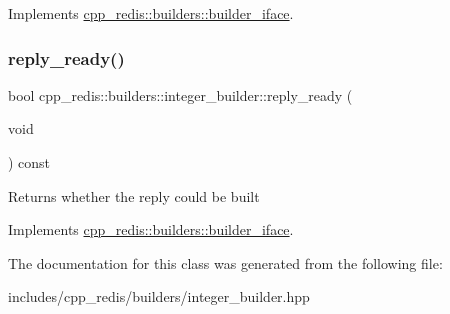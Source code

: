 Implements \mbox{\hyperlink{classcpp__redis_1_1builders_1_1builder__iface_a9892bbc9c887c31c2742dad4476e2fa6}{cpp\+\_\+redis\+::builders\+::builder\+\_\+iface}}.

\mbox{\label{classcpp__redis_1_1builders_1_1integer__builder_a4893dc36d06d75094bb4fe3fbc826966}} 
\subsubsection{\texorpdfstring{reply\+\_\+ready()}{reply\_ready()}}
{\footnotesize\ttfamily bool cpp\+\_\+redis\+::builders\+::integer\+\_\+builder\+::reply\+\_\+ready (\begin{DoxyParamCaption}\item[{void}]{ }\end{DoxyParamCaption}) const\hspace{0.3cm}{\ttfamily [virtual]}}

\begin{DoxyReturn}{Returns}
whether the reply could be built 
\end{DoxyReturn}


Implements \mbox{\hyperlink{classcpp__redis_1_1builders_1_1builder__iface_a40db9a31d4ea1771777e74146d31e12d}{cpp\+\_\+redis\+::builders\+::builder\+\_\+iface}}.



The documentation for this class was generated from the following file\+:\begin{DoxyCompactItemize}
\item 
includes/cpp\+\_\+redis/builders/integer\+\_\+builder.\+hpp\end{DoxyCompactItemize}
